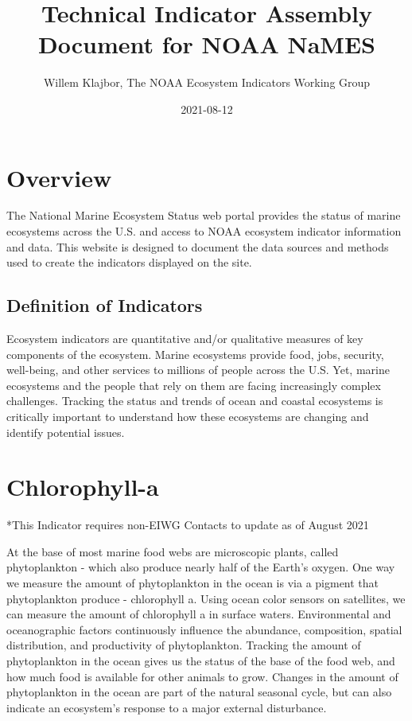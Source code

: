 \documentclass[
]{book}
\title{Technical Indicator Assembly Document for NOAA NaMES}
\author{Willem Klajbor, The NOAA Ecosystem Indicators Working Group}
\date{2021-08-12}
\begin{document}
\maketitle

{
\setcounter{tocdepth}{1}
\tableofcontents
}
\hypertarget{overview}{%
\chapter*{Overview}\label{overview}}

The National Marine Ecosystem Status web portal provides the status of marine ecosystems across the U.S. and access to NOAA ecosystem indicator information and data. This website is designed to document the data sources and methods used to create the indicators displayed on the site.

\hypertarget{definition-of-indicators}{%
\section{Definition of Indicators}\label{definition-of-indicators}}

Ecosystem indicators are quantitative and/or qualitative measures of key components of the ecosystem. Marine ecosystems provide food, jobs, security, well-being, and other services to millions of people across the U.S. Yet, marine ecosystems and the people that rely on them are facing increasingly complex challenges. Tracking the status and trends of ocean and coastal ecosystems is critically important to understand how these ecosystems are changing and identify potential issues.

\hypertarget{chlorophyll-a}{%
\chapter{Chlorophyll-a}\label{chlorophyll-a}}

*This Indicator requires non-EIWG Contacts to update as of August 2021

At the base of most marine food webs are microscopic plants, called phytoplankton - which also produce nearly half of the Earth's oxygen. One way we measure the amount of phytoplankton in the ocean is via a pigment that phytoplankton produce - chlorophyll a. Using ocean color sensors on satellites, we can measure the amount of chlorophyll a in surface waters. Environmental and oceanographic factors continuously influence the abundance, composition, spatial distribution, and productivity of phytoplankton. Tracking the amount of phytoplankton in the ocean gives us the status of the base of the food web, and how much food is available for other animals to grow. Changes in the amount of phytoplankton in the ocean are part of the natural seasonal cycle, but can also indicate an ecosystem's response to a major external disturbance.
\end{document}
